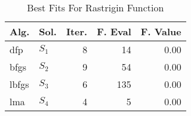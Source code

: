 \begin{table}
\centering
\caption{Best Fits For Rastrigin Function}
\label{solutions:rastrigin30d}
\begin{tabular}{llrrr}
\toprule
 Alg. &    Sol. &  Iter. &  F. Eval &  F. Value \\
\midrule
  dfp & $S_{1}$ &      8 &       14 &      0.00 \\
 bfgs & $S_{2}$ &      9 &       54 &      0.00 \\
lbfgs & $S_{3}$ &      6 &      135 &      0.00 \\
  lma & $S_{4}$ &      4 &        5 &      0.00 \\
\bottomrule
\end{tabular}
\end{table}
